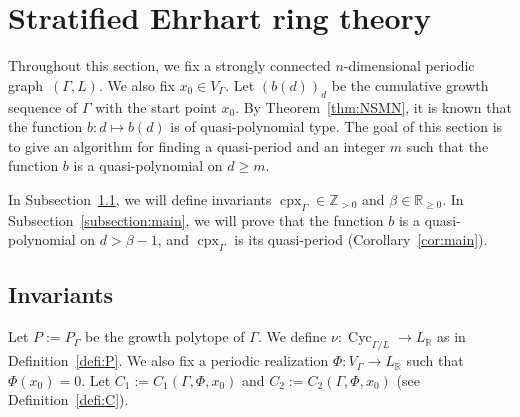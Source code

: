 \documentclass[11pt]{article}
\theoremstyle{definition}
\numberwithin{equation}{section}
\begin{document}
\section{Stratified Ehrhart ring theory}\label{section:main}

Throughout this section, we fix a strongly connected $n$-dimensional periodic graph~$(\Gamma , L)$. 
We also fix $x_0 \in V_{\Gamma}$. 
Let $(b(d))_d$ be the cumulative growth sequence of $\Gamma$ with the start point $x_0$. 
By Theorem~\ref{thm:NSMN}, it is known that the function $b: d \mapsto b(d)$ is of quasi-polynomial type. 
The goal of this section is to give an algorithm for finding a quasi-period and an integer $m$ such that 
the function $b$ is a quasi-polynomial on $d \ge m$. 

In Subsection~\ref{subsection:inv}, 
we will define invariants $\operatorname{cpx}_{\Gamma} \in \mathbb{Z}_{>0}$ and $\beta \in \mathbb{R}_{\ge 0}$. 
In Subsection~\ref{subsection:main}, 
we will prove that the function $b$ is a quasi-polynomial on $d > \beta -1$, 
and $\operatorname{cpx}_{\Gamma}$ is its quasi-period 
(Corollary~\ref{cor:main}). 

\subsection{Invariants}\label{subsection:inv}

Let $P := P_{\Gamma}$ be the growth polytope of $\Gamma$. 
We define $\nu: \operatorname{Cyc}_{\Gamma /L} \to L_{\mathbb{R}}$ as in Definition~\ref{defi:P}. 
We also fix a periodic realization $\Phi: V_{\Gamma} \to L_{\mathbb{R}}$ such that $\Phi (x_0) = 0$. 
Let $C_1 := C_{1}(\Gamma, \Phi, x_0)$ and $C_2:= C_{2}(\Gamma, \Phi, x_0)$ (see Definition~\ref{defi:C}). 
\end{document}
